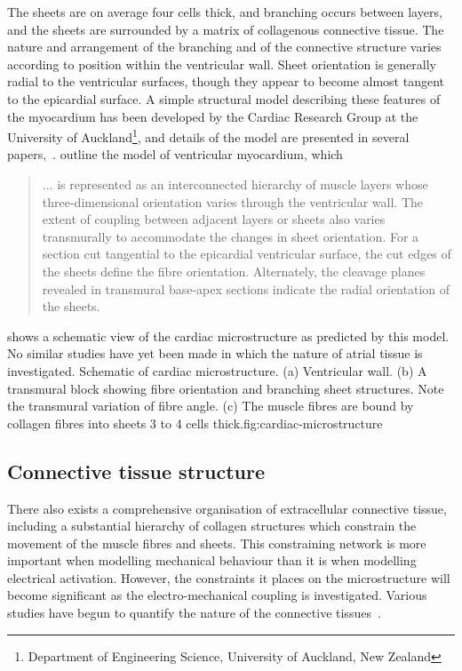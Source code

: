 The sheets are on average four cells thick, and branching occurs between
layers, and the sheets are surrounded by a matrix of collagenous connective
tissue.  The nature and arrangement of the branching and of the connective
structure varies according to position within the ventricular wall.  Sheet
orientation is generally radial to the ventricular surfaces, though they
appear to become almost tangent to the epicardial surface.  A simple
structural model describing these features of the myocardium has been
developed by the Cardiac Research Group at the University of
Auckland\footnote{Department of Engineering Science, University of Auckland,
  New Zealand}, and details of the model are presented in several
papers,~\cite{hunter:pilkington:1993,hunter:panfilov:1996}.
 outline the model of ventricular
myocardium, which 
\begin{quote}
  $\ldots$ is represented as an interconnected hierarchy of muscle layers
  whose three-dimensional orientation varies through the ventricular wall.
  The extent of coupling between adjacent layers or sheets also varies
  transmurally to accommodate the changes in sheet orientation.  For a section
  cut tangential to the epicardial ventricular surface, the cut edges of the
  sheets define the fibre orientation.  Alternately, the cleavage planes
  revealed in transmural base-apex sections indicate the radial orientation of
  the sheets.
\end{quote}
 shows a schematic view of the cardiac
microstructure as predicted by this model.  No similar studies have yet been
made in which the nature of atrial tissue is investigated.
{Schematic of cardiac microstructure.  (a) Ventricular wall.  (b) A transmural
  block showing fibre orientation and branching sheet structures.  Note the
  transmural variation of fibre angle.  (c) The muscle fibres are bound by
  collagen fibres into sheets 3 to 4 cells thick.}{fig:cardiac-microstructure}

\subsection{Connective tissue structure}

There also exists a comprehensive organisation of extracellular connective
tissue, including a substantial hierarchy of collagen structures which
constrain the movement of the muscle fibres and sheets.  This constraining
network is more important when modelling mechanical behaviour than it is when
modelling electrical activation.  However, the constraints it places on the
microstructure will become significant as the electro-mechanical coupling is
investigated.  Various studies have begun to quantify the nature of the
connective tissues~\cite{caulfield:1979,mackenna:1994}.

